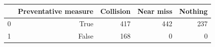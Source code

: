 \begin{tabular}{lrrrr}
\toprule
 & Preventative measure & Collision & Near miss & Nothing \\
\midrule
0 & True & 417 & 442 & 237 \\
1 & False & 168 & 0 & 0 \\
\bottomrule
\end{tabular}
